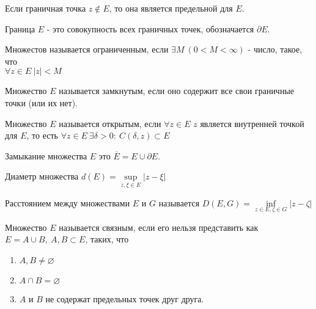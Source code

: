 \begin{note}
    Если граничная точка $z \notin E$, то она является предельной для $E$.
\end{note}

\begin{definition}
    Граница $E$ - это совокупность всех граничных точек, обозначается $\partial E$.
\end{definition}

\begin{definition}
    Множестов называется ограниченным, если $\exists M \ (0 < M < \infty)$ - число, такое, что\\
    $\forall z \in E \ \left| z \right| < M$
\end{definition}

\begin{definition}
    Множество $E$ называется замкнутым, если оно содержит все свои граничные точки (или их нет).
\end{definition}

\begin{definition}
    Множество $E$ называется открытым, если $\forall z \in E$ $z$ является внутренней точкой для $E$, то есть 
    $\forall z \in E \ \exists \delta > 0: \ C(\delta, z) \subset E$
\end{definition}

\begin{definition}
    Замыкание множества $E$ это $\overline{E} = E \cup \partial E$.
\end{definition}

\begin{definition}
    Диаметр множества $d(E) = \underset{z, \xi \in E}{\sup} \left| z - \xi\right|$
\end{definition}

\begin{definition}
    Расстоянием между множествами $E$ и $G$ называется $D(E, G) = \underset{z \in E, \zeta \in G}{\inf} \left|z - \zeta\right|$
\end{definition}

\begin{definition}
    Множество $E$ называется связным, если его нельзя представить как $E = A \cup B, \ A, B \subset E$, таких, что 
    \begin{enumerate}
        \item $A, B \neq \varnothing$
        \item $A \cap B = \varnothing$
        \item $A$ и $B$ не содержат предельных точек друг друга.
    \end{enumerate}  
\end{definition}

